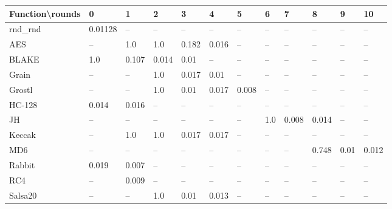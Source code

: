 \documentclass[
  print, %
  Table,   %
  nolof,     %
  nolot,     %
  11pt, %
  oneside  %
]{fithesis3}
\newcommand{\fd}{\cellcolor{red!13}}
\newcommand{\fn}{\cellcolor{green!13}}
\begin{document}
\begin{table}[H]
\centering
\begin{tabular}{l|l l l l l l l l l l l}
Function\textbackslash{}rounds & 0 & 1 & 2 & 3 & 4 & 5 & 6 & 7 & 8 & 9 & 10\\ \hline
rnd\_rnd     & \fn{}0.01128 & --    & --    & --    & --    & --    & --    & --    & --    & --    & --   \\
AES          & \fd{}--    & \fd{}1.0   & \fd{}1.0   & \fd{}0.182 & \fn{}0.016 & \fn{}--    & \fn{}--    & \fn{}--    & \fn{}--    & \fn{}--    & \fn{}--   \\
BLAKE        & \fd{}1.0   & \fd{}0.107 & \fn{}0.014 & \fn{}0.01  & \fn{}--    & \fn{}--    & \fn{}--    & \fn{}--    & \fn{}--    & \fn{}--    & \fn{}--   \\
Grain        & \fd{}--    & \fd{}--    & \fd{}1.0   & \fn{}0.017 & \fn{}0.01  & \fn{}--    & \fn{}--    & \fn{}--    & \fn{}--    & \fn{}--    & \fn{}--   \\
Grostl       & \fd{}--    & \fd{}--    & \fd{}1.0   & \fn{}0.01  & \fn{}0.017 & \fn{}0.008 & \fn{}--    & \fn{}--    & \fn{}--    & \fn{}--    & \fn{}--   \\
HC-128       & \fn{}0.014 & \fn{}0.016 & \fn{}--    & \fn{}--    & \fn{}--    & \fn{}--    & \fn{}--    & \fn{}--    & \fn{}--    & \fn{}--    & \fn{}--   \\
JH           & \fd{}--    & \fd{}--    & \fd{}--    & \fd{}--    & \fd{}--    & \fd{}--    & \fd{}1.0   & \fn{}0.008 & \fn{}0.014 & \fn{}--    & \fn{}--   \\
Keccak       & \fd{}--    & \fd{}1.0   & \fd{}1.0   & \fn{}0.017 & \fn{}0.017 & \fn{}--    & \fn{}--    & \fn{}--    & \fn{}--    & \fn{}--    & \fn{}--   \\
MD6          & \fd{}--    & \fd{}--    & \fd{}--    & \fd{}--    & \fd{}--    & \fd{}--    & \fd{}--    & \fd{}--    & \fd{}0.748 & \fn{}0.01  & \fn{}0.012\\
Rabbit       & \fn{}0.019 & \fn{}0.007 & \fn{}--    & \fn{}--    & \fn{}--    & \fn{}--    & \fn{}--    & \fn{}--    & \fn{}--    & \fn{}--    & \fn{}--   \\
RC4          & \fd{}--    & \fn{}0.009 & \fn{}--    & \fn{}--    & \fn{}--    & \fn{}--    & \fn{}--    & \fn{}--    & \fn{}--    & \fn{}--    & \fn{}--   \\
Salsa20      & \fd{}--    & \fd{}--    & \fd{}1.0   & \fn{}0.01  & \fn{}0.013 & \fn{}--    & \fn{}--    & \fn{}--    & \fn{}--    & \fn{}--    & \fn{}--   \\

\end{tabular}
\end{table}
\end{document}

